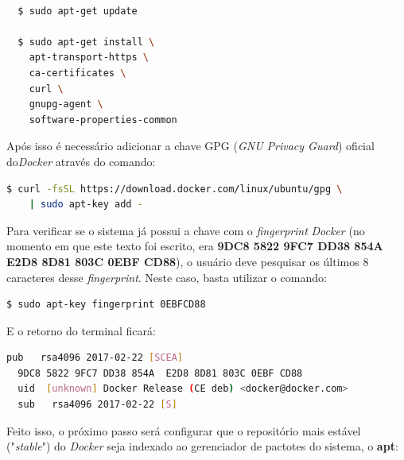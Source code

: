\documentclass[
  12pt,				%
  openright,			%
  twoside,			%
  a4paper,			%
  english,			%
  french,				%
  spanish,			%
  brazil,				%
  ]{abntex2}
\begin{document}
\newpage
\begin{adjustbox}{max width=\linewidth}
  \begin{lstlisting}[language=bash]

  $ sudo apt-get update

  $ sudo apt-get install \
    apt-transport-https \
    ca-certificates \
    curl \
    gnupg-agent \
    software-properties-common
  \end{lstlisting}
\end{adjustbox}


Após isso é necessário adicionar a chave GPG (\textit{GNU Privacy Guard}) oficial do\textit{Docker} através do comando:

\begin{adjustbox}{max width=\linewidth}
  \begin{lstlisting}[language=bash]
  $ curl -fsSL https://download.docker.com/linux/ubuntu/gpg \
    | sudo apt-key add -
  \end{lstlisting}
\end{adjustbox}

Para verificar se o sistema já possui a chave com o \textit{fingerprint} \textit{Docker} (no momento em que este texto foi escrito,
era \textbf{9DC8 5822 9FC7 DD38 854A E2D8 8D81 803C 0EBF CD88}), o usuário deve pesquisar os últimos 8 caracteres desse \textit{fingerprint}. Neste caso, basta utilizar o comando:

\begin{adjustbox}{max width=\linewidth}
  \begin{lstlisting}[language=bash]
    $ sudo apt-key fingerprint 0EBFCD88
    \end{lstlisting}
\end{adjustbox}

E o retorno do terminal ficará:

\begin{adjustbox}{max width=\linewidth}
  \begin{lstlisting}[language=bash]
  pub   rsa4096 2017-02-22 [SCEA]
  9DC8 5822 9FC7 DD38 854A  E2D8 8D81 803C 0EBF CD88
  uid  [unknown] Docker Release (CE deb) <docker@docker.com>
  sub   rsa4096 2017-02-22 [S]
\end{lstlisting}
\end{adjustbox}

Feito isso, o próximo passo será configurar que o repositório mais estável ("\textit{stable}") do \textit{Docker} seja indexado ao gerenciador de
pactotes do sistema, o \textbf{apt}:
\end{document}
